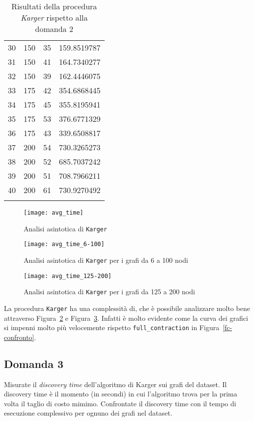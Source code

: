 \begin{center}
\begin{longtable}{|c|c|c|c|}
		30 & 150 & 35 & 159.8519787 \\		 	
		31 & 150 & 41 & 164.7340277 \\		
		32 & 150 & 39 & 162.4446075 \\		
		33 & 175 & 42 & 354.6868445 \\		
		34 & 175 & 45 & 355.8195941 \\		 
		35 & 175 & 53 & 376.6771329 \\		   
		36 & 175 & 43 & 339.6508817 \\		
		37 & 200 & 54 & 730.3265273 \\		
		38 & 200 & 52 & 685.7037242 \\		
		39 & 200 & 51 & 708.7966211 \\		
		40 & 200 & 61 & 730.9270492 \\			
		\hline
		\caption{Risultati della procedura \textit{Karger} rispetto alla domanda 2}
		\label{k-results}
	\end{longtable}
\end{center}\vspace{-40pt}

\begin{figure}[H]
	\centering
	\texttt{[image: avg\_time]}
	\caption{Analisi asintotica di \texttt{Karger}}
	\label{k-confronto}
\end{figure}

\begin{figure}[H]
	\centering
	\texttt{[image: avg\_time\_6-100]}
	\caption{Analisi asintotica di \texttt{Karger} per i grafi da 6 a 100 nodi}
	\label{k-confronto1}
\end{figure}

\begin{figure}[H]
	\centering
	\texttt{[image: avg\_time\_125-200]}
	\caption{Analisi asintotica di \texttt{Karger} per i grafi da 125 a 200 nodi}
	\label{k-confronto2}
\end{figure}

La procedura \texttt{Karger} ha una complessità di, che è possibile analizzare molto bene attraverso Figura~\ref{k-confronto1} e Figura~\ref{k-confronto2}. Infatti è molto evidente come la curva dei grafici si impenni molto più velocemente rispetto \texttt{full\_contraction} in Figura~\ref{fc-confronto}.

\subsection{Domanda 3}
Misurate il \textit{discovery time} dell'algoritmo di Karger sui grafi del dataset. Il discovery time è il momento (in secondi) in cui l'algoritmo trova per la prima volta il taglio di costo mimimo.  Confrontate il discovery time con il tempo di esecuzione complessivo per ognuno dei grafi nel dataset.

